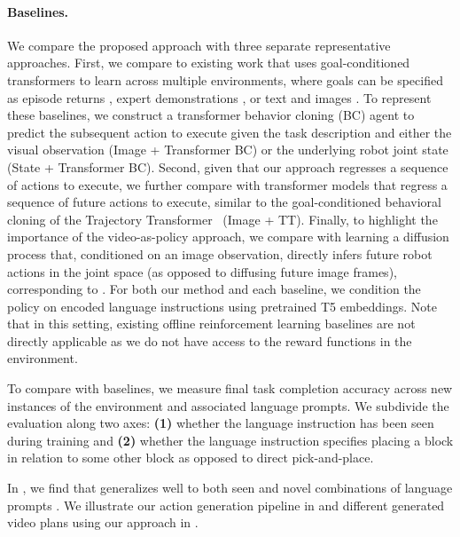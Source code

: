 


 
\vspace{-7pt}
\paragraph{Baselines.} We compare the proposed approach with three separate representative approaches. First, we compare to existing work that uses goal-conditioned transformers to learn across multiple environments, where goals can be specified as episode returns \citep{lee2022multi}, expert demonstrations \citep{reed2022generalist}, or text and images \citep{brohan2022rt}. To represent these baselines, we construct a transformer behavior cloning (BC) agent to predict the subsequent action to execute given the task description and either the visual observation (Image + Transformer BC) or the underlying robot joint state (State + Transformer BC). Second, given that our approach regresses a sequence of actions to execute, we further compare with transformer models that regress a sequence of future actions to execute, similar to the goal-conditioned behavioral cloning of the Trajectory Transformer~\citep{janner2021offline} (Image + TT). Finally, to highlight the importance of the video-as-policy approach, we compare \model with learning a diffusion process that, conditioned on an image observation, directly infers future robot actions in the joint space (as opposed to diffusing future image frames), corresponding to \citep{janner2022planning,ajay2022conditional}. For both our method and each baseline, we condition the policy on encoded language instructions using pretrained T5 embeddings. 
 Note that in this setting, existing offline reinforcement learning baselines are not directly applicable as we do not have access to the reward functions in the environment.
 


 To compare \model with baselines, we measure final task completion accuracy across new instances of the environment and associated language prompts. We subdivide the evaluation along two axes: \textbf{(1)} whether the language instruction has been seen during training and \textbf{(2)} whether the language instruction specifies placing a block in relation to some other block as opposed to direct pick-and-place.



 In , we find that \model generalizes well to both seen and novel combinations of language prompts . We illustrate our action generation pipeline in  and different generated video plans using our approach in .

